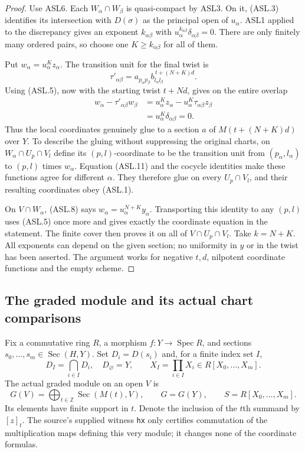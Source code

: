 \documentclass[11pt,a4paper]{article}
\numberwithin{equation}{section}
\theoremstyle{remark}\newtheorem{remark}[theorem]{Remark}
\begin{document}
\begin{proof}
Use ASL6.  Each $W_\alpha\cap W_\beta$ is quasi-compact by
ASL3.  On it, (ASL.3) identifies its intersection with
$D(\sigma)$ as the principal open of $u_\alpha$.
ASL1 applied to the discrepancy gives an exponent
$k_{\alpha\beta}$ with
$u_\alpha^{k_{\alpha\beta}}\delta_{\alpha\beta}=0$.
There are only finitely many ordered pairs, so choose one
$K\ge k_{\alpha\beta}$ for all of them.

Put $w_\alpha=u_\alpha^Kz_\alpha$.  The transition unit for
the final twist is
\[
 \tau'_{\alpha\beta}
   =a_{p_\alpha p_\beta}
            b_{l_\alpha l_\beta}^{\,t+(N+K)d}.
\]
Using (ASL.5), now with the starting twist $t+Nd$, gives on
the entire overlap
\[
 \begin{split}
 w_\alpha-\tau'_{\alpha\beta}w_\beta
  &=u_\alpha^Kz_\alpha
             -u_\alpha^K\tau_{\alpha\beta}z_\beta\\
  &=u_\alpha^K\delta_{\alpha\beta}=0.
 \end{split}                                            \tag{ASL.11}
\]
Thus the local coordinates genuinely glue to a section $a$ of
$M(t+(N+K)d)$ over $Y$.  To describe the gluing without suppressing
the original charts, on $W_\alpha\cap U_p\cap V_l$ define its
$(p,l)$-coordinate to be the transition unit from
$(p_\alpha,l_\alpha)$ to $(p,l)$ times $w_\alpha$.
Equation (ASL.11) and the cocycle identities make these functions
agree for different $\alpha$.  They therefore glue on every
$U_p\cap V_l$, and their resulting coordinates obey (ASL.1).

On $V\cap W_\alpha$, (ASL.8) says
$w_\alpha=u_\alpha^{N+K}y_\alpha$.
Transporting this identity to any $(p,l)$ uses (ASL.5) once
more and gives exactly the coordinate equation in the statement.
The finite cover then proves it on all of
$V\cap U_p\cap V_l$.  Take $k=N+K$.
All exponents can depend on the given section; no uniformity in
$y$ or in the twist has been asserted.  The argument works for
negative $t,d$, nilpotent coordinate functions and the empty scheme.
\end{proof}

\subsection{The graded module and its actual chart comparisons}

Fix a commutative ring $R$, a morphism
$f:Y\to\operatorname{Spec}R$, and sections
$s_0,\ldots,s_m\in\operatorname{Sec}(H,Y)$.
Set $D_i=D(s_i)$ and, for a finite index set $I$,
\[
 D_I=\bigcap_{i\in I}D_i,\quad D_\varnothing=Y,
 \qquad X_I=\prod_{i\in I}X_i\in R[X_0,\ldots,X_m].
                                                        \tag{ASL.12}
\]
The actual graded module on an open $V$ is
\[
 G(V)=\bigoplus_{t\in\mathbb Z}\operatorname{Sec}(M(t),V),
 \qquad G=G(Y),\qquad S=R[X_0,\ldots,X_m].          \tag{ASL.13}
\]
Its elements have finite support in $t$.  Denote the inclusion of
the $t$th summand by $[z]_t$.  The source's supplied witness
\texttt{hx} only certifies commutation of the multiplication maps
defining this very module; it changes none of the coordinate formulas.
\end{document}
